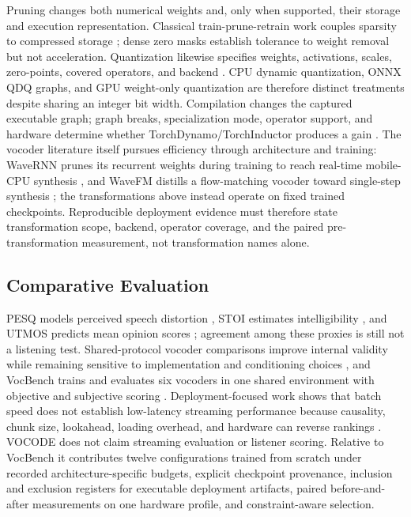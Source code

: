 Pruning changes both numerical weights and, only when supported, their
storage and execution representation.  Classical train-prune-retrain work
couples sparsity to compressed storage \citep{han2015pruning};
dense zero masks establish tolerance to weight removal but not
acceleration.
Quantization likewise specifies weights, activations, scales, zero-points,
covered operators, and backend \citep{jacob2018quantization}.  CPU dynamic
quantization, ONNX QDQ graphs, and GPU weight-only quantization are therefore
distinct treatments despite sharing an integer bit width.  Compilation
changes the captured executable graph; graph breaks, specialization mode,
operator support, and hardware determine whether TorchDynamo/TorchInductor
produces a gain \citep{ansel2024pytorch2}.  The vocoder literature itself
pursues efficiency through architecture and training: WaveRNN prunes its
recurrent weights during training to reach real-time mobile-CPU synthesis
\citep{kalchbrenner2018wavernn}, and WaveFM distills a flow-matching
vocoder toward single-step synthesis \citep{luo2025wavefm}; the
transformations above instead operate on fixed trained checkpoints.
Reproducible deployment
evidence must therefore state transformation scope, backend, operator
coverage, and the paired pre-transformation measurement, not transformation
names alone.

\subsection{Comparative Evaluation}

PESQ models perceived speech distortion \citep{rix2001pesq}, STOI estimates
intelligibility \citep{taal2011stoi}, and UTMOS predicts mean opinion scores
\citep{saeki2022utmos}; agreement among these proxies is still not a listening
test.  Shared-protocol vocoder comparisons improve internal validity while
remaining sensitive to implementation and conditioning choices
\citep{govalkar2019comparison}, and VocBench trains and evaluates six
vocoders in one shared environment with objective and subjective scoring
\citep{albadawy2022vocbench}.  Deployment-focused work shows that
batch speed does not establish low-latency streaming performance because
causality, chunk size, lookahead, loading overhead, and hardware can reverse
rankings \citep{yoneyama2025comparative}.  VOCODE does not claim streaming
evaluation or listener scoring.  Relative to VocBench it contributes twelve configurations trained from
scratch under recorded architecture-specific budgets, explicit checkpoint
provenance, inclusion and exclusion registers for executable deployment
artifacts, paired before-and-after measurements on one hardware profile,
and constraint-aware selection.
